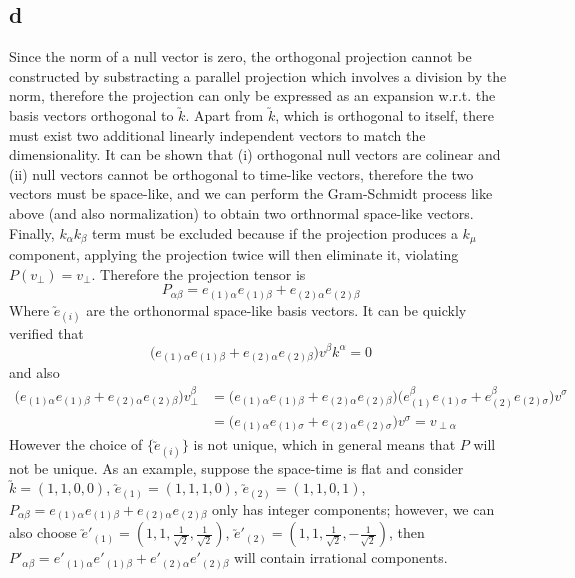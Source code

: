 \documentclass{article}
\begin{document}
\subsection*{d}
Since the norm of a null vector is zero, the orthogonal projection cannot be constructed by substracting a parallel projection which involves a division by the norm, therefore the projection can only be expressed as an expansion w.r.t. the basis vectors orthogonal to $\utilde{k}$. Apart from $\utilde{k}$, which is orthogonal to itself, there must exist two additional linearly independent vectors to match the dimensionality. It can be shown that (i) orthogonal null vectors are colinear and (ii) null vectors cannot be orthogonal to time-like vectors, therefore the two vectors must be space-like, and we can perform the Gram-Schmidt process like above (and also normalization) to obtain two orthnormal space-like vectors. Finally, $k_\alpha k_\beta$ term must be excluded because if the projection produces a $k_\mu$ component, applying the projection twice will then eliminate it, violating $P(v_\perp) = v_\perp$. Therefore the projection tensor is
\[ P_{\alpha\beta} = e_{(1)\alpha}e_{(1)\beta} + e_{(2)\alpha}e_{(2)\beta}\]
Where $\utilde{e}_{(i)}$ are the orthonormal space-like basis vectors. It can be quickly verified that
\[  \Big(e_{(1)\alpha}e_{(1)\beta} + e_{(2)\alpha}e_{(2)\beta}\Big) v^\beta k^\alpha = 0 \]
and also
\begin{align*}
\Big(e_{(1)\alpha}e_{(1)\beta} + e_{(2)\alpha}e_{(2)\beta}\Big)v_\perp^\beta
&=  \Big(e_{(1)\alpha}e_{(1)\beta} + e_{(2)\alpha}e_{(2)\beta}\Big)
	\Big(e_{(1)}^\beta e_{(1)\sigma} + e_{(2)}^\beta e_{(2)\sigma}\Big)v^\sigma  \\
&= \Big(e_{(1)\alpha} e_{(1)\sigma} + e_{(2)\alpha} e_{(2)\sigma}\Big)v^\sigma = v_{\perp\alpha}
\end{align*}
However the choice of $\{ \utilde{e}_{(i)} \}$ is not unique, which in general means that $P$ will not be unique. As an example, suppose the space-time is flat and consider $\utilde{k} = (1,1,0,0)$, $\utilde{e}_{(1)} = (1,1,1,0)$, $\utilde{e}_{(2)} = (1,1,0,1)$, $P_{\alpha\beta} = e_{(1)\alpha}e_{(1)\beta} + e_{(2)\alpha}e_{(2)\beta}$ only has integer components; however, we can also choose $\utilde{e}'_{(1)} = (1,1,\frac{1}{\sqrt{2}},\frac{1}{\sqrt{2}})$, $\utilde{e}'_{(2)} = (1,1, \frac{1}{\sqrt{2}},-\frac{1}{\sqrt{2}})$, then $P'_{\alpha\beta} = e'_{(1)\alpha}e'_{(1)\beta} + e'_{(2)\alpha}e'_{(2)\beta}$
will contain irrational components.
\section{}
\end{document}
